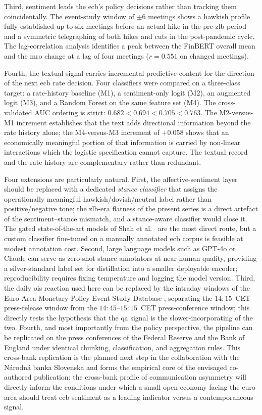 Third, sentiment leads the \gls{ecb}'s policy decisions rather than tracking them coincidentally. The event-study window of $\pm 6$ meetings shows a hawkish profile fully established up to six meetings before an actual hike in the pre-\gls{zlb} period and a symmetric telegraphing of both hikes and cuts in the post-pandemic cycle. The lag-correlation analysis identifies a peak between the FinBERT overall mean and the \gls{mro} change at a lag of four meetings ($r = 0.551$ on changed meetings).

Fourth, the textual signal carries incremental predictive content for the direction of the next \gls{ecb} rate decision. Four classifiers were compared on a three-class target: a rate-history baseline (M1), a sentiment-only logit (M2), an augmented logit (M3), and a Random Forest on the same feature set (M4). The cross-validated AUC ordering is strict: $0.682 < 0.694 < 0.705 < 0.763$. The M2-versus-M1 increment establishes that the text adds directional information beyond the rate history alone; the M4-versus-M3 increment of $+0.058$ shows that an economically meaningful portion of that information is carried by non-linear interactions which the logistic specification cannot capture. The textual record and the rate history are complementary rather than redundant.

Four extensions are particularly natural. First, the affective-sentiment layer should be replaced with a dedicated \emph{stance classifier} that assigns the operationally meaningful hawkish/dovish/neutral label rather than positive/negative tone; the \gls{zlb}-era flatness of the present series is a direct artefact of the sentiment--stance mismatch, and a stance-aware classifier would close it. The gated state-of-the-art models of Shah et al.\ \cite{shah2023trillion, shah2025wcb} are the most direct route, but a custom classifier fine-tuned on a manually annotated \gls{ecb} corpus is feasible at modest annotation cost. Second, large language models such as GPT-4o or Claude can serve as zero-shot stance annotators at near-human quality, providing a silver-standard label set for distillation into a smaller deployable encoder; reproducibility requires fixing temperature and logging the model version. Third, the daily \gls{ois} reaction used here can be replaced by the intraday windows of the Euro Area Monetary Policy Event-Study Database \cite{altavilla2019measuring}, separating the $14{:}15$~CET press-release window from the $14{:}45$--$15{:}15$~CET press-conference window; this directly tests the hypothesis that the \gls{qa} signal is the slower-incorporating of the two. Fourth, and most importantly from the policy perspective, the pipeline can be replicated on the press conferences of the Federal Reserve and the Bank of England under identical chunking, classification, and aggregation rules. This cross-bank replication is the planned next step in the collaboration with the Národná banka Slovenska and forms the empirical core of the envisaged co-authored publication: the cross-bank profile of communication asymmetry will directly inform the conditions under which a small open economy facing the euro area should treat \gls{ecb} sentiment as a leading indicator versus a contemporaneous signal.

